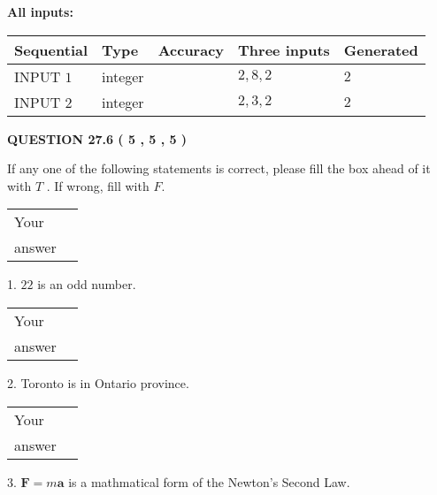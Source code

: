 \documentclass[12pt]{article}
\begin{document}
   
   
   
\noindent\vspace{0.1in}\hspace{-0.08in} {\textbf{\Large{All inputs: }}}
   
   
  
  
\noindent\begin{tabular}{|l|l|l|l|l|}
\hline
 Sequential & Type & Accuracy & Three inputs & Generated \\ 
\hline
 
 
  INPUT $            1 $ & integer &  & $
 2
 , 
 8
 , 
 2
 $ & $ 2 $ 
 \\  \hline  
 
 
  INPUT $            2 $ & integer &  & $
 2
 , 
 3
 , 
 2
 $ & $ 2 $ 
 \\  \hline  
 \end{tabular}
   
   
  
\vspace{0.2in}
  
{\textbf{\Large{QUESTION
27.6 
 (           5 ,           5 ,           5 )
}}}
  
  
If any one of the following statements is correct, please fill the box ahead of it with $T$ .
If wrong, fill with $F$.
 
\noindent\begin{tabular}{|l|l|}\hline Your&\hspace{.2in} \\ answer&\hspace{.2in} \\ \hline \end{tabular}
1. $ %
22$ is an  %
odd number.
 
\noindent\begin{tabular}{|l|l|}\hline Your&\hspace{.2in} \\ answer&\hspace{.2in} \\ \hline \end{tabular}
2.  %
Toronto is in  %
Ontario province.
 
\noindent\begin{tabular}{|l|l|}\hline Your&\hspace{.2in} \\ answer&\hspace{.2in} \\ \hline \end{tabular}
3.  %
$\mathbf{F}=m\mathbf{a}$ is a mathmatical form of
the Newton's Second Law.
 
\end{document}
